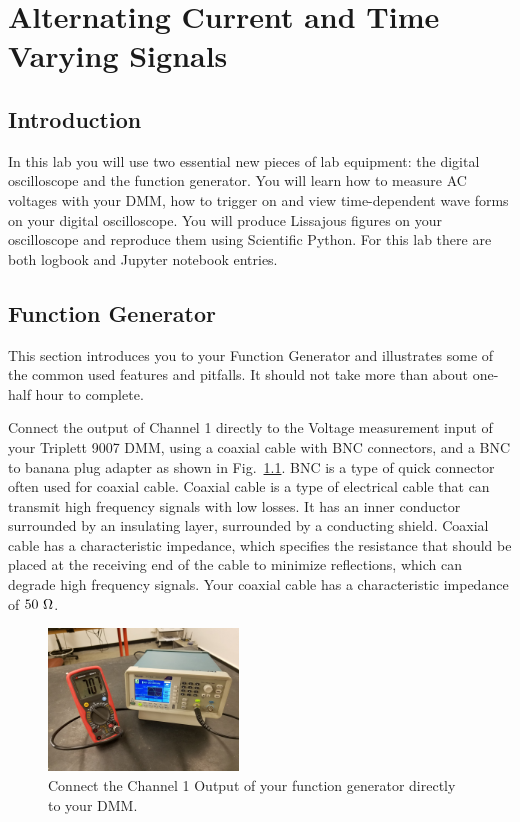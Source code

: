 \chapter{Alternating Current and Time Varying Signals}

\section{Introduction}

In this lab you will use two essential new pieces of lab equipment:
the digital oscilloscope and the function generator.  You will learn
how to measure AC voltages with your DMM, how to trigger on and view
time-dependent wave forms on your digital oscilloscope.  You will
produce Lissajous figures on your oscilloscope and reproduce them
using Scientific Python.  For this lab there are both logbook and
Jupyter notebook entries.

\section{Function Generator}

This section introduces you to your Function Generator and illustrates
some of the common used features and pitfalls.  It should not take
more than about one-half hour to complete.

Connect the output of Channel 1 directly to the Voltage measurement
input of your Triplett 9007 DMM, using a coaxial cable with BNC
connectors, and a BNC to banana plug adapter as shown in
Fig.~\ref{fig:dmm_setup}.  BNC is a type of quick connector often used
for coaxial cable.  Coaxial cable is a type of electrical cable that
can transmit high frequency signals with low losses. It has an inner
conductor surrounded by an insulating layer, surrounded by a
conducting shield.  Coaxial cable has a characteristic impedance,
which specifies the resistance that should be placed at the receiving
end of the cable to minimize reflections, which can degrade high
frequency signals.  Your coaxial cable has a characteristic impedance
of $50~\rm \Omega$.

\begin{figure}[htbp]
\begin{center}
\includegraphics[width=0.45\textwidth]{figs/labs/lissajous/generator_dmm_setup.jpg} 
\caption{Connect the Channel 1 Output of your function generator directly to your DMM.}
\label{fig:dmm_setup}
\end{center}
\end{figure}

